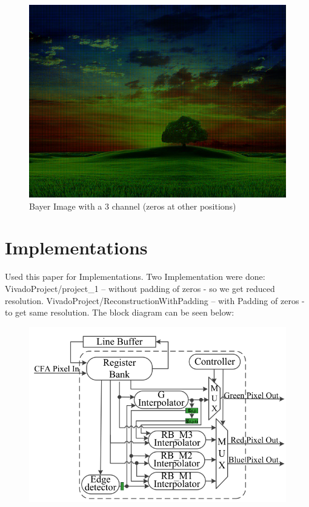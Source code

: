 \documentclass{article}
\begin{document}
\begin{figure}[H]
    \begin{center}
        \includegraphics[scale=0.7]{DocResources/BayerImage_3Channel.png}
        \caption{Bayer Image with a 3 channel (zeros at other positions)}
    \end{center}
\end{figure}


\section{Implementations}
Used this paper\cite{papera} for Implementations.
Two Implementation were done: VivadoProject/project\_1 -- without padding of zeros - so we get reduced resolution. VivadoProject/ReconstructionWithPadding -- with Padding of zeros - to get same resolution.
The block diagram can be seen below:
\begin{figure}[H]
    \centering
    \includegraphics[scale=0.5]{DocResources/BlockDiagram.png}
\end{figure}
\end{document}
